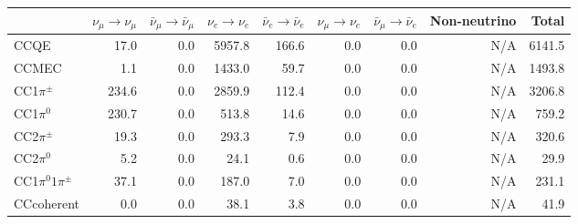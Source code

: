 \newpage
\begin{table}
\begin{adjustbox}{width=1\textwidth}
\begin{tabular} {  l r  r  r  r  r  r  r  r  }
\hline
              & $\nu_{\mu} \rightarrow \nu_{\mu}$ & $\bar{\nu}_{\mu} \rightarrow \bar{\nu}_{\mu}$ & $\nu_{e} \rightarrow \nu_{e}$ & $\bar{\nu}_{e} \rightarrow \bar{\nu}_{e}$ & $\nu_{\mu} \rightarrow \nu_{e}$ & $\bar{\nu}_{\mu} \rightarrow \bar{\nu}_{e}$ & Non-neutrino         & Total                \\ \hline\hline
 CCQE         & 17.0                 & 0.0                  & 5957.8               & 166.6                & 0.0                  & 0.0                  & N/A                  & 6141.5               \\ \hline
 CCMEC        & 1.1                  & 0.0                  & 1433.0               & 59.7                 & 0.0                  & 0.0                  & N/A                  & 1493.8               \\ \hline
 CC1$\pi^{\pm}$ & 234.6                & 0.0                  & 2859.9               & 112.4                & 0.0                  & 0.0                  & N/A                  & 3206.8               \\ \hline
 CC1$\pi^{0}$   & 230.7                & 0.0                  & 513.8                & 14.6                 & 0.0                  & 0.0                  & N/A                  & 759.2                \\ \hline
 CC2$\pi^{\pm}$ & 19.3                 & 0.0                  & 293.3                & 7.9                  & 0.0                  & 0.0                  & N/A                  & 320.6                \\ \hline
 CC2$\pi^{0}$   & 5.2                  & 0.0                  & 24.1                 & 0.6                  & 0.0                  & 0.0                  & N/A                  & 29.9                 \\ \hline
 CC1$\pi^{0}1\pi^{\pm}$ & 37.1                 & 0.0                  & 187.0                & 7.0                  & 0.0                  & 0.0                  & N/A                  & 231.1                \\ \hline
 CCcoherent   & 0.0                  & 0.0                  & 38.1                 & 3.8                  & 0.0                  & 0.0                  & N/A                  & 41.9                 \\ \hline

\end{tabular}
\end{adjustbox}
\end{table}
